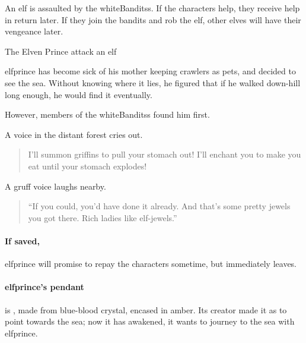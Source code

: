\label{littleprince}

\noindent
An elf is assaulted by the \glspl{whiteBandits}.
If the characters help, they receive help in return later.
If they join the bandits and rob the elf, other elves will have their vengeance later.

{The Elven Prince}%
{ attack an elf}%

\begin{exampletext}
  \Gls{elfprince} has become sick of his mother keeping \glspl{crawler} as pets, and decided to see the sea.
  Without knowing where it lies, he figured that if he walked down-hill long enough, he would find it eventually.
\end{exampletext}

However, members of the \glspl{whiteBandits} found him first.

\begin{boxtext}
  A voice in the distant forest cries out.
  \begin{quote}
    I'll summon griffins to pull your stomach out!  I'll enchant you to make you eat until your stomach explodes!
  \end{quote}

  A gruff voice laughs nearby.

  \begin{quote}
    ``If you could, you'd have done it already.  And that's some pretty jewels you got there.  Rich ladies like elf-jewels.''
  \end{quote}

\end{boxtext}


\paragraph{If saved,}
\gls{elfprince} will promise to repay the characters sometime, but immediately leaves.

\paragraph{\Gls{elfprince}'s pendant}
is , made from blue-blood crystal, encased in amber.
Its creator made it as  to point towards the sea; now it has awakened, it wants to journey to the sea with \gls{elfprince}.

